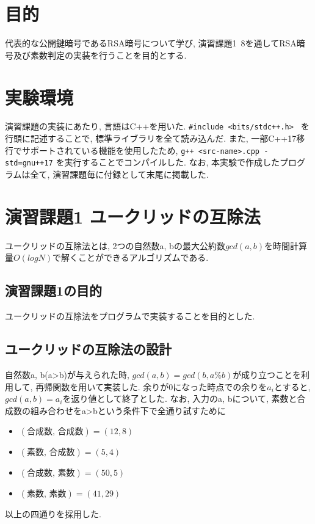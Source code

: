 \documentclass[xelatex, 11pt, a4paper, ja=standard]{bxjsarticle}
\begin{document}
\maketitle

\section{目的}
    代表的な公開鍵暗号であるRSA暗号について学び, 演習課題1~8を通してRSA暗号及び素数判定の実装を行うことを目的とする. 

\section{実験環境}
演習課題の実装にあたり, 言語はC++を用いた. \verb|#include <bits/stdc++.h> |
を行頭に記述することで, 標準ライブラリを全て読み込んだ. 
また, 一部C++17移行でサポートされている機能を使用したため, 
\verb|g++ <src-name>.cpp -std=gnu++17|
を実行することでコンパイルした. 
なお, 本実験で作成したプログラムは全て, 演習課題毎に付録として末尾に掲載した. 


\section{演習課題1 ユークリッドの互除法}
    ユークリッドの互除法とは, 2つの自然数a, bの最大公約数$gcd(a, b)$を時間計算量$O(log N)$で解くことができるアルゴリズムである. 

\subsection{演習課題1の目的}
    ユークリッドの互除法をプログラムで実装することを目的とした. 
    
\subsection{ユークリッドの互除法の設計}
自然数a, b(a>b)が与えられた時, $gcd(a, b) = gcd(b, a\%b)$が成り立つことを利用して, 
再帰関数を用いて実装した. 余りが0になった時点での余りを$a_i$とすると, $gcd(a, b)=a_i$を返り値として終了とした. 
なお, 入力のa, bについて, 素数と合成数の組み合わせをa>bという条件下で全通り試すために
\begin{itemize}
    \item $(\text{合成数, 合成数}) = (12, 8)$
    \item $(\text{素数, 合成数}) = (5, 4)$
    \item $(\text{合成数, 素数}) = (50, 5)$
    \item $(\text{素数, 素数}) = (41, 29)$
\end{itemize}
以上の四通りを採用した. 
\end{document}
